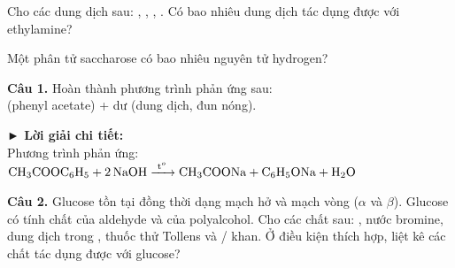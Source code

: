 \documentclass[11pt,a4paper]{article}
\begin{document}
\begin{ex}
Cho các dung dịch sau: , , , . Có bao nhiêu dung dịch tác dụng được với ethylamine?
\end{ex}

\begin{ex}
Một phân tử saccharose có bao nhiêu nguyên tử hydrogen?
\end{ex}

\vspace{6pt}
\vspace{4pt}

\noindent\textbf{Câu 1.} Hoàn thành phương trình phản ứng sau:\\
 (phenyl acetate) +  dư (dung dịch, đun nóng).

\begin{tcolorbox}[colback=white,colframe=solBlue,arc=1mm,boxrule=0.5pt,top=2mm,bottom=2mm,left=3mm,right=3mm]
{\color{solBlue}\textbf{► Lời giải chi tiết:}}\\
Phương trình phản ứng:\\
$\ce{CH3COOC6H5 + 2NaOH ->[t^o] CH3COONa + C6H5ONa + H2O}$
\end{tcolorbox}

\vspace{6pt}
\noindent\textbf{Câu 2.} Glucose tồn tại đồng thời dạng mạch hở và mạch vòng ($\alpha$ và $\beta$). Glucose có tính chất của aldehyde và của polyalcohol. Cho các chất sau: , nước bromine, dung dịch  trong , thuốc thử Tollens và / khan. Ở điều kiện thích hợp, liệt kê các chất tác dụng được với glucose?
\end{document}
